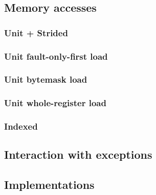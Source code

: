 \subsection{Memory accesses}

\subsubsection{Unit + Strided}

\subsubsection{Unit fault-only-first load}
\subsubsection{Unit bytemask load}
\subsubsection{Unit whole-register load}

\subsubsection{Indexed}

\subsection{Interaction with exceptions}

\subsection{Implementations}